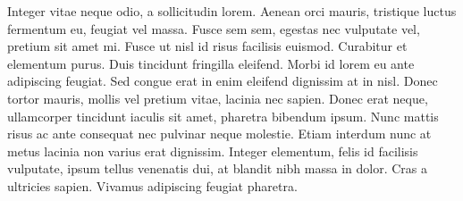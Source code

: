 Integer vitae neque odio, a sollicitudin lorem. Aenean orci mauris, tristique luctus fermentum eu, feugiat vel massa. Fusce sem sem, egestas nec vulputate vel, pretium sit amet mi. Fusce ut nisl id risus facilisis euismod. Curabitur et elementum purus. Duis tincidunt fringilla eleifend. Morbi id lorem eu ante adipiscing feugiat. Sed congue erat in enim eleifend dignissim at in nisl. Donec tortor mauris, mollis vel pretium vitae, lacinia nec sapien. Donec erat neque, ullamcorper tincidunt iaculis sit amet, pharetra bibendum ipsum. Nunc mattis risus ac ante consequat nec pulvinar neque molestie. Etiam interdum nunc at metus lacinia non varius erat dignissim. Integer elementum, felis id facilisis vulputate, ipsum tellus venenatis dui, at blandit nibh massa in dolor. Cras a ultricies sapien. Vivamus adipiscing feugiat pharetra.